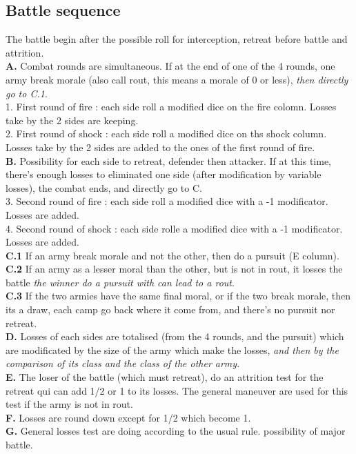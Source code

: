 \subsection{Battle sequence}
\noindent
The battle begin after the possible roll for interception, retreat
before battle and attrition.\\
{\bf A.} Combat rounds are simultaneous. If at the end of one of the 4 
rounds, one
army break morale (also call rout, this means a morale of 0 or less), {\it
then directly go to C.1}.\\
1. First round of fire : each side roll a modified dice on the fire
colomn. Losses take by the 2 sides are keeping.\\
2. First round of shock : each side roll a modified dice on ths shock
column. Losses take by the 2 sides are added to the ones of the first   
round of fire.\\
{\bf B.} Possibility for each side to retreat, defender then attacker.
If at this time, there's enough losses to eliminated one side (after 
modification by variable losses), the combat ends, and 
directly
go to C.\\
3. Second round of fire : each side roll a modified dice with a -1
modificator. Losses are added. \\
4. Second round of shock : each side rolle a modified dice with a -1
modificator. Losses are added. \\   
{\bf C.1} If an army break morale and not the other, then do a pursuit (E
column). \\
{\bf C.2} If an army as a lesser moral than the other, but is not in rout, it
losses the battle {\it the winner do a pursuit with can lead to a rout}. \\
{\bf C.3} If the two armies have the same final moral, or if the two break
morale, then its a draw, each camp go back where it come from, and there's
no pursuit nor retreat.\\
{\bf D.} Losses of each sides are totalised (from the 4 rounds, and the pursuit)
which are modificated by the size of the army which make the losses,
{\it and then by the comparison of its class and the class of the other
army}.\\
{\bf E.} The loser of the battle (which must retreat), do an attrition test for
the retreat qui can add 1/2 or 1  to its losses. The general maneuver are
used for this test if the army is not in rout. \\
{\bf F.}  Losses are round down except for 1/2 which become 1.\\
{\bf G.} General losses test are doing according to the usual rule. possibility
of major battle.

